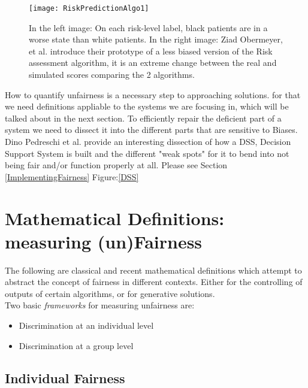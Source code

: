 \begin{figure}[h]
  \begin{center}
    \texttt{[image: RiskPredictionAlgo1]}
    \cite{OPVM19}
    \caption{In the left image: On each risk-level label, black patients are in a worse state than white patients. In the right image: Ziad Obermeyer, et al. introduce their prototype of a less biased version of the Risk assessment algorithm, it is an extreme change between the real and simulated scores comparing the 2 algorithms.}
  \end{center}
\end{figure}

How to quantify unfairness is a necessary step to approaching solutions.\cite{SHG*18} for that we need definitions appliable to the systems we are focusing in, which will be talked about in the next section. To efficiently repair the deficient part of a system we need to dissect it into the different parts that are sensitive to Biases. Dino Pedreschi et al. provide an interesting dissection of how a DSS, Decision Support System is built and the different "weak spots" for it to bend into not being fair and/or function properly at all. Please see Section \ref{ImplementingFairness} Figure:\ref{DSS}

\section{Mathematical Definitions: measuring (un)Fairness}
\label{mathdefinitions}
The following are classical and recent mathematical definitions which attempt to abstract the concept of fairness in different contexts. Either for the controlling of outputs of certain algorithms, or for generative solutions.\\
Two basic \textsl{frameworks} for measuring unfairness are:
\begin{itemize}
  \item Discrimination at an individual level
  \item Discrimination at a group level
\end{itemize}


\subsection{Individual Fairness}

